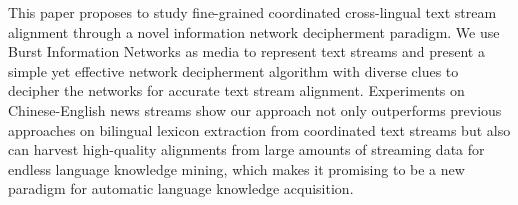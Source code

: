 This paper proposes to study fine-grained coordinated cross-lingual text stream alignment through a novel information network decipherment paradigm. We use Burst Information Networks as media to represent text streams and present a simple yet effective network decipherment algorithm with diverse clues to decipher the networks for accurate text stream alignment. Experiments on Chinese-English news streams show our approach not only outperforms previous approaches on bilingual lexicon extraction from coordinated text streams but also can harvest high-quality alignments from large amounts of streaming data for endless language knowledge mining, which makes it promising to be a new paradigm for automatic language knowledge acquisition.
